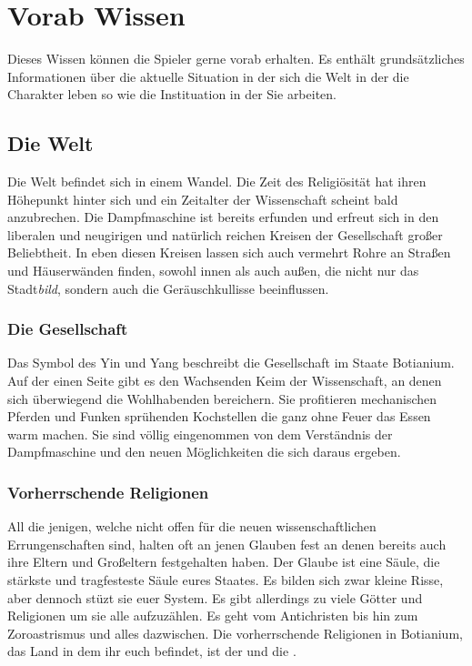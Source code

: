\section{Vorab Wissen}
    Dieses Wissen können die Spieler gerne vorab erhalten. Es enthält grundsätzliches Informationen über die aktuelle Situation in der sich die Welt in der die Charakter leben so wie die Instituation in der Sie arbeiten.

    \subsection{Die Welt}
        Die Welt befindet sich in einem Wandel. Die Zeit des Religiösität hat ihren Höhepunkt hinter sich und ein Zeitalter der Wissenschaft scheint bald anzubrechen. Die Dampfmaschine ist bereits erfunden und erfreut sich in den liberalen und neugirigen und natürlich reichen Kreisen der Gesellschaft großer Beliebtheit. In eben diesen Kreisen lassen sich auch vermehrt Rohre an Straßen und Häuserwänden finden, sowohl innen als auch außen, die nicht nur das Stadt\emph{bild}, sondern auch die Geräuschkullisse beeinflussen.

        \subsubsection{Die Gesellschaft}
            \label{subsubsec:die-gesellschaft}
            Das Symbol des Yin und Yang beschreibt die Gesellschaft im Staate Botianium. Auf der einen Seite gibt es den Wachsenden Keim der Wissenschaft, an denen sich überwiegend die Wohlhabenden bereichern. Sie profitieren mechanischen Pferden und Funken sprühenden Kochstellen die ganz ohne Feuer das Essen warm machen. Sie sind völlig eingenommen von dem Verständnis der Dampfmaschine und den neuen Möglichkeiten die sich daraus ergeben.

        \subsubsection{Vorherrschende Religionen}
            \label{subsubsec:vorherschende-religionen}
            All die jenigen, welche nicht offen für die neuen wissenschaftlichen Errungenschaften sind, halten oft an jenen Glauben fest an denen bereits auch ihre Eltern und Großeltern festgehalten haben. Der Glaube ist eine Säule, die stärkste und tragfesteste Säule eures Staates. Es bilden sich zwar kleine Risse, aber dennoch stüzt sie euer System. Es gibt allerdings zu viele Götter und Religionen um sie alle aufzuzählen. Es geht vom Antichristen bis hin zum Zoroastrismus und alles dazwischen. Die vorherrschende Religionen in Botianium, das Land in dem ihr euch befindet, ist der  und die .


